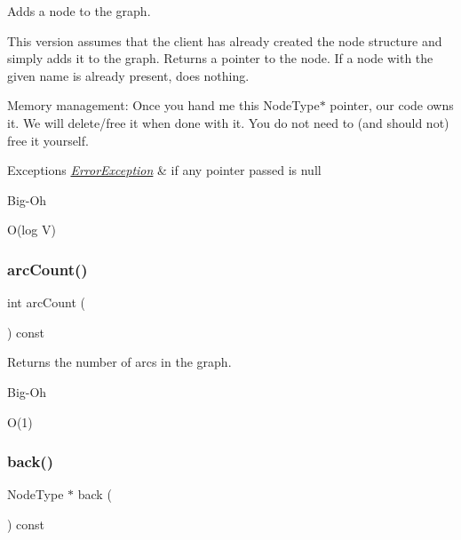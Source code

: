 Adds a node to the graph. 

This version assumes that the client has already created the node structure and simply adds it to the graph. Returns a pointer to the node. If a node with the given name is already present, does nothing.

Memory management\+: Once you hand me this Node\+Type$\ast$ pointer, our code owns it. We will delete/free it when done with it. You do not need to (and should not) free it yourself.


\begin{DoxyExceptions}{Exceptions}
{\em \mbox{\hyperlink{classErrorException}{Error\+Exception}}} & if any pointer passed is null \\
\hline
\end{DoxyExceptions}
\begin{DoxyRefDesc}{Big-\/\+Oh}
\item[\mbox{\hyperlink{BigOh__BigOh000046}{Big-\/\+Oh}}]O(log V) \end{DoxyRefDesc}
\mbox{\label{classGraph_ac0b108b3354f5222d2c829dcd639fa7a}} 
\subsubsection{\texorpdfstring{arc\+Count()}{arcCount()}}
{\footnotesize\ttfamily int arc\+Count (\begin{DoxyParamCaption}{ }\end{DoxyParamCaption}) const}



Returns the number of arcs in the graph. 

\begin{DoxyRefDesc}{Big-\/\+Oh}
\item[\mbox{\hyperlink{BigOh__BigOh000047}{Big-\/\+Oh}}]O(1) \end{DoxyRefDesc}
\mbox{\label{classGraph_a27d59ef129bb56cc144ecc81c0affd34}} 
\subsubsection{\texorpdfstring{back()}{back()}}
{\footnotesize\ttfamily Node\+Type $\ast$ back (\begin{DoxyParamCaption}{ }\end{DoxyParamCaption}) const}



